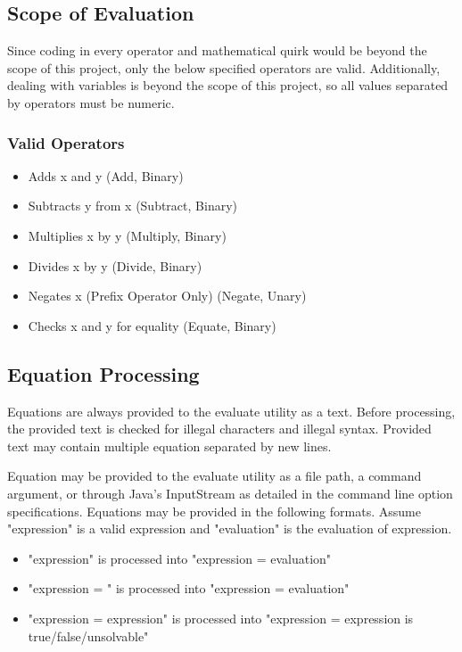 \documentclass{article}
\begin{document}
\subsection{Scope of Evaluation}
Since coding in every operator and mathematical quirk would be beyond the scope of this project, only the below specified operators are valid. Additionally, dealing with variables is beyond the scope of this project, so all values separated by operators must be numeric.
\subsubsection{Valid Operators}
\begin{itemize}
	\item {} Adds x and y (Add, Binary)
	\item {} Subtracts y from x (Subtract, Binary)
	\item {} Multiplies x by y (Multiply, Binary)
	\item {} Divides x by y (Divide, Binary)
	\item {} Negates x (Prefix Operator Only) (Negate, Unary)
	\item {} Checks x and y for equality (Equate, Binary)
\end{itemize}

\subsection{Equation Processing}
Equations are always provided to the evaluate utility as a text. Before processing, the provided text is checked for illegal characters and illegal syntax. Provided text may contain multiple equation separated by new lines.

Equation may be provided to the evaluate utility as a file path, a command argument, or through Java's InputStream as detailed in the command line option specifications. Equations may be provided in the following formats. Assume "expression" is a valid expression and "evaluation" is the evaluation of expression.

\begin{itemize}
	\item "expression" is processed into "expression = evaluation"
	\item "expression = " is processed into "expression = evaluation"
	\item "expression = expression" is processed into "expression = expression is true/false/unsolvable"
\end{itemize}
\end{document}
